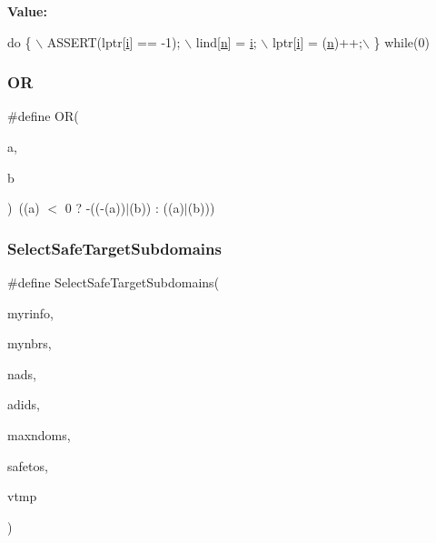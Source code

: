 {\bfseries Value\+:}
\begin{DoxyCode}
\textcolor{keywordflow}{do} \{ \(\backslash\)
     ASSERT(lptr[\hyperlink{a01014_afb6aca53df96564f2adf086c942453ec}{i}] == -1); \(\backslash\)
     lind[\hyperlink{a00563_a4c2d80ab32fc3a598413ae25e9f2bdce}{n}] = \hyperlink{a01014_afb6aca53df96564f2adf086c942453ec}{i}; \(\backslash\)
     lptr[\hyperlink{a01014_afb6aca53df96564f2adf086c942453ec}{i}] = (\hyperlink{a00563_a4c2d80ab32fc3a598413ae25e9f2bdce}{n})++;\(\backslash\)
   \} \textcolor{keywordflow}{while}(0)
\end{DoxyCode}
\mbox{\label{a00921_af69441c33563ebe0eb0312939509bba3}} 
\subsubsection{\texorpdfstring{OR}{OR}}
{\footnotesize\ttfamily \#define OR(\begin{DoxyParamCaption}\item[{}]{a,  }\item[{}]{b }\end{DoxyParamCaption})~((a) $<$ 0 ? -\/((-\/(a))$\vert$(b)) \+: ((a)$\vert$(b)))}

\mbox{\label{a00921_a83d02a6c5a464ef6c6f3f55e2a29aa0d}} 
\subsubsection{\texorpdfstring{Select\+Safe\+Target\+Subdomains}{SelectSafeTargetSubdomains}}
{\footnotesize\ttfamily \#define Select\+Safe\+Target\+Subdomains(\begin{DoxyParamCaption}\item[{}]{myrinfo,  }\item[{}]{mynbrs,  }\item[{}]{nads,  }\item[{}]{adids,  }\item[{}]{maxndoms,  }\item[{}]{safetos,  }\item[{}]{vtmp }\end{DoxyParamCaption})}

